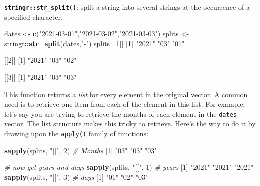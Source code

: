 \documentclass[
]{book}
\newenvironment{Shaded}{\begin{snugshade}}{\end{snugshade}}
\newcommand{\CommentTok}[1]{\textcolor[rgb]{0.56,0.35,0.01}{\textit{#1}}}
\newcommand{\DecValTok}[1]{\textcolor[rgb]{0.00,0.00,0.81}{#1}}
\newcommand{\KeywordTok}[1]{\textcolor[rgb]{0.13,0.29,0.53}{\textbf{#1}}}
\newcommand{\NormalTok}[1]{#1}
\newcommand{\OperatorTok}[1]{\textcolor[rgb]{0.81,0.36,0.00}{\textbf{#1}}}
\newcommand{\StringTok}[1]{\textcolor[rgb]{0.31,0.60,0.02}{#1}}
\begin{document}
\textbf{\texttt{stringr::str\_split()}}: split a string into several strings at the occurrence of a specified character.

\begin{Shaded}
\begin{Highlighting}[]
\NormalTok{dates <-}\StringTok{ }\KeywordTok{c}\NormalTok{(}\StringTok{"2021-03-01"}\NormalTok{,}\StringTok{"2021-03-02"}\NormalTok{,}\StringTok{"2021-03-03"}\NormalTok{)}
\NormalTok{splits <-}\StringTok{ }\NormalTok{stringr}\OperatorTok{::}\KeywordTok{str_split}\NormalTok{(dates,}\StringTok{"-"}\NormalTok{)}
\NormalTok{splits}
\NormalTok{[[}\DecValTok{1}\NormalTok{]]}
\NormalTok{[}\DecValTok{1}\NormalTok{] }\StringTok{"2021"} \StringTok{"03"}   \StringTok{"01"}  

\NormalTok{[[}\DecValTok{2}\NormalTok{]]}
\NormalTok{[}\DecValTok{1}\NormalTok{] }\StringTok{"2021"} \StringTok{"03"}   \StringTok{"02"}  

\NormalTok{[[}\DecValTok{3}\NormalTok{]]}
\NormalTok{[}\DecValTok{1}\NormalTok{] }\StringTok{"2021"} \StringTok{"03"}   \StringTok{"03"}  
\end{Highlighting}
\end{Shaded}

This function returns a \emph{list} for every element in the original vector. A common need is to retrieve one item from each of the element in this list. For example, let's say you are trying to retrieve the months of each element in the \texttt{dates} vector. The list structure makes this tricky to retrieve. Here's the way to do it by drawing upon the \texttt{apply()} family of functions:

\begin{Shaded}
\begin{Highlighting}[]
\KeywordTok{sapply}\NormalTok{(splits, }\StringTok{"[["}\NormalTok{, }\DecValTok{2}\NormalTok{) }\CommentTok{# Months}
\NormalTok{[}\DecValTok{1}\NormalTok{] }\StringTok{"03"} \StringTok{"03"} \StringTok{"03"}

\CommentTok{# now get years and days}
\KeywordTok{sapply}\NormalTok{(splits, }\StringTok{"[["}\NormalTok{, }\DecValTok{1}\NormalTok{) }\CommentTok{# years}
\NormalTok{[}\DecValTok{1}\NormalTok{] }\StringTok{"2021"} \StringTok{"2021"} \StringTok{"2021"}
\KeywordTok{sapply}\NormalTok{(splits, }\StringTok{"[["}\NormalTok{, }\DecValTok{3}\NormalTok{) }\CommentTok{# days}
\NormalTok{[}\DecValTok{1}\NormalTok{] }\StringTok{"01"} \StringTok{"02"} \StringTok{"03"}
\end{Highlighting}
\end{Shaded}
\end{document}
